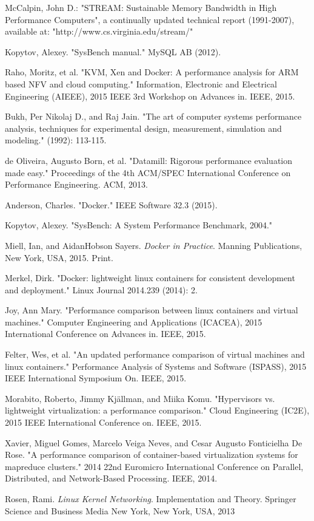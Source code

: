 \documentclass[11pt]{article}
\begin{document}
\begin{thebibliography}{99}
	McCalpin, John D.: "STREAM: Sustainable Memory Bandwidth in
	High Performance Computers", a continually updated technical report
	(1991-2007), available at: "http://www.cs.virginia.edu/stream/"
	
	Kopytov, Alexey. "SysBench manual." MySQL AB (2012).
	
	Raho, Moritz, et al. "KVM, Xen and Docker: A performance analysis for ARM based NFV and cloud computing." Information, Electronic and Electrical Engineering (AIEEE), 2015 IEEE 3rd Workshop on Advances in. IEEE, 2015.
	
	Bukh, Per Nikolaj D., and Raj Jain. "The art of computer systems performance analysis, techniques for experimental design, measurement, simulation and modeling." (1992): 113-115.
	
	de Oliveira, Augusto Born, et al. "Datamill: Rigorous performance evaluation made easy." Proceedings of the 4th ACM/SPEC International Conference on Performance Engineering. ACM, 2013.
	
	Anderson, Charles. "Docker." IEEE Software 32.3 (2015).
	
	Kopytov, Alexey. "SysBench: A System Performance Benchmark, 2004."
	
	Miell, Ian, and AidanHobson Sayers. \textit{Docker in Practice}. Manning Publications, New York, USA, 2015. Print.
	
	Merkel, Dirk. "Docker: lightweight linux containers for consistent development and deployment." Linux Journal 2014.239 (2014): 2.
	
	Joy, Ann Mary. "Performance comparison between linux containers and virtual machines." Computer Engineering and Applications (ICACEA), 2015 International Conference on Advances in. IEEE, 2015.
	
	Felter, Wes, et al. "An updated performance comparison of virtual machines and linux containers." Performance Analysis of Systems and Software (ISPASS), 2015 IEEE International Symposium On. IEEE, 2015.
	
	Morabito, Roberto, Jimmy Kjällman, and Miika Komu. "Hypervisors vs. lightweight virtualization: a performance comparison." Cloud Engineering (IC2E), 2015 IEEE International Conference on. IEEE, 2015.
	
	Xavier, Miguel Gomes, Marcelo Veiga Neves, and Cesar Augusto Fonticielha De Rose. "A performance comparison of container-based virtualization systems for mapreduce clusters." 2014 22nd Euromicro International Conference on Parallel, Distributed, and Network-Based Processing. IEEE, 2014.
	
	Rosen, Rami. \textit{Linux Kernel Networking}. Implementation and Theory. Springer Science and Business Media New York, New York, USA, 2013
	 
\end{thebibliography}
\end{document}
